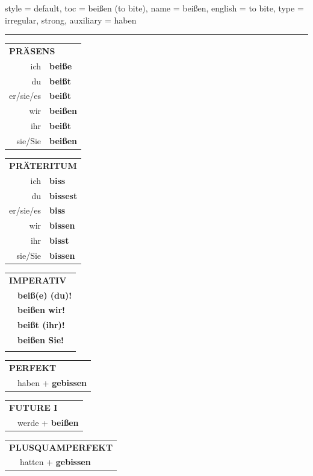 \begin{verbentry}{
  style = {default},
  toc = {beißen (to bite)},
  name = {beißen},
  english = {to bite},
  type = {irregular, strong},
  auxiliary = {haben}
}
 
    
     \vspace{5pt}

    \hrule
    
    \vspace{5pt}

  \begin{tabular}{rl}
     \multicolumn{2}{l}{\textbf{PRÄSENS} }\\
    ich & \textbf{beiße}\\
    du & \textbf{beißt}\\
    er/sie/es & \textbf{beißt}\\
    wir & \textbf{beißen}\\
    ihr & \textbf{beißt}\\
    sie/Sie & \textbf{beißen}\\
  \end{tabular}
  \hfill
     \begin{tabular}{rl}
    \multicolumn{2}{l}{\textbf{PRÄTERITUM} }\\
    ich & \textbf{biss}\\
    du & \textbf{bissest}\\
    er/sie/es & \textbf{biss}\\
    wir & \textbf{bissen}\\
    ihr & \textbf{bisst}\\
    sie/Sie & \textbf{bissen}\\
  \end{tabular}
  \hfill
  \begin{tabular}{rl}
     \multicolumn{2}{l}{\textbf{IMPERATIV} }\\
   & \textbf{beiß(e) (du)!}\\
   & \textbf{beißen wir!}\\
   & \textbf{beißt (ihr)!}\\
   & \textbf{beißen Sie!}\\
   & \vspace{10pt}
  \end{tabular}

    \vspace{10pt}

 \begin{tabular}{rl}
     \multicolumn{2}{l}{\textbf{PERFEKT}}\\
   & haben + \textbf{gebissen}\\
  \end{tabular}
\hfill
   \begin{tabular}{rl}
    \multicolumn{2}{l}{\textbf{FUTURE I} }\\
   & werde + \textbf{beißen}\\
  \end{tabular}
\hfill
   \begin{tabular}{rl}
      \multicolumn{2}{l}{\textbf{PLUSQUAMPERFEKT}}\\
   & hatten + \textbf{gebissen}\\
  \end{tabular}


\end{verbentry}
